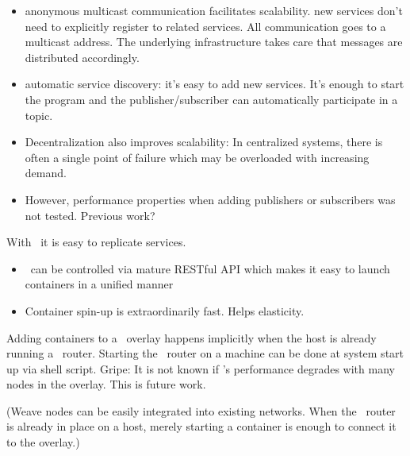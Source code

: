 \begin{itemize}
\item anonymous multicast communication facilitates scalability. new services don't need to explicitly register to related services. All communication goes to a multicast address. The underlying infrastructure takes care that messages are distributed accordingly.
\item automatic service discovery: it's easy to add new services. It's enough to start the program and the publisher/subscriber can automatically participate in a topic.
\item Decentralization also improves scalability: In centralized systems, there is often a single point of failure which may be overloaded with increasing demand. 
\item However, performance properties when adding publishers or subscribers was not tested. Previous work?
\end{itemize}

With \docker\ it is easy to replicate services. 
\begin{itemize}
\item \docker\ can be controlled via mature RESTful API which makes it easy to launch containers in a unified manner
\item Container spin-up is extraordinarily fast. Helps elasticity.
\end{itemize}

Adding containers to a \weave\ overlay happens implicitly when the host is already running a \weave\ router. Starting the \weave\ router on a machine can be done at system start up via shell script. Gripe: It is not known if \weave 's performance degrades with many nodes in the overlay. This is future work.

(Weave nodes can be easily integrated into existing networks. When the \weave\ router is already in place on a host, merely starting a container is enough to connect it to the overlay.)

